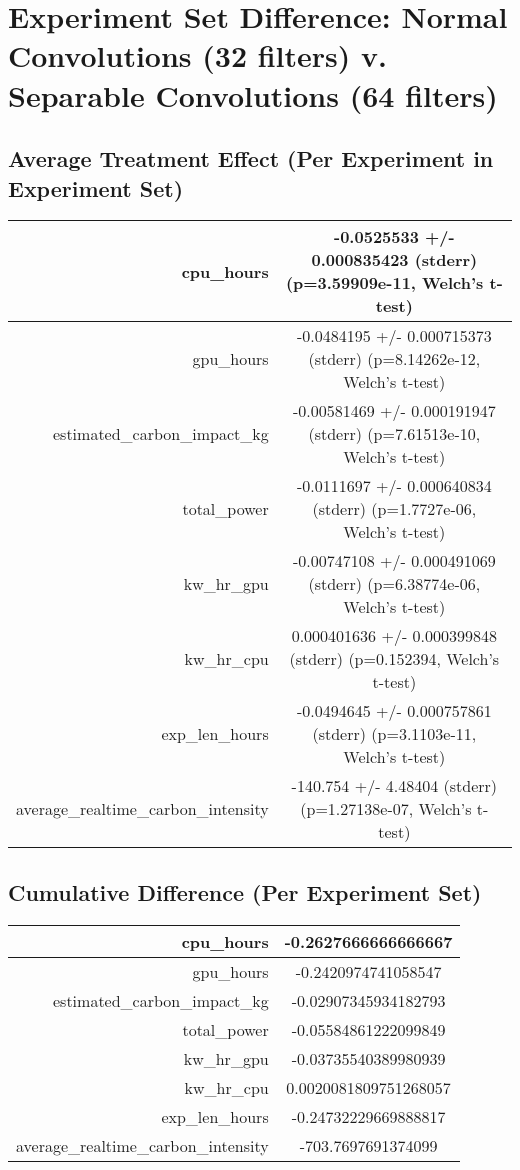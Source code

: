 \documentclass{article}%
\begin{document}
%
\normalsize%
\section{Experiment Set Difference: Normal Convolutions (32 filters) v. Separable Convolutions (64 filters)}%
\label{sec:Experiment Set Difference Normal Convolutions (32 filters) v. Separable Convolutions (64 filters)}%
\subsection{Average Treatment Effect (Per Experiment in Experiment Set)}%
\label{subsec:Average Treatment Effect (Per Experiment in Experiment Set)}%
\begin{tabular}{|r|c|}%
\hline%
cpu\_hours&{-}0.0525533 +/{-} 0.000835423 (stderr) (p=3.59909e{-}11, Welch's t{-}test)\\%
\hline%
gpu\_hours&{-}0.0484195 +/{-} 0.000715373 (stderr) (p=8.14262e{-}12, Welch's t{-}test)\\%
\hline%
estimated\_carbon\_impact\_kg&{-}0.00581469 +/{-} 0.000191947 (stderr) (p=7.61513e{-}10, Welch's t{-}test)\\%
\hline%
total\_power&{-}0.0111697 +/{-} 0.000640834 (stderr) (p=1.7727e{-}06, Welch's t{-}test)\\%
\hline%
kw\_hr\_gpu&{-}0.00747108 +/{-} 0.000491069 (stderr) (p=6.38774e{-}06, Welch's t{-}test)\\%
\hline%
kw\_hr\_cpu&0.000401636 +/{-} 0.000399848 (stderr) (p=0.152394, Welch's t{-}test)\\%
\hline%
exp\_len\_hours&{-}0.0494645 +/{-} 0.000757861 (stderr) (p=3.1103e{-}11, Welch's t{-}test)\\%
\hline%
average\_realtime\_carbon\_intensity&{-}140.754 +/{-} 4.48404 (stderr) (p=1.27138e{-}07, Welch's t{-}test)\\%
\hline%
\end{tabular}

%
\subsection{Cumulative Difference (Per Experiment Set)}%
\label{subsec:Cumulative Difference (Per Experiment Set)}%
\begin{tabular}{|r|c|}%
\hline%
cpu\_hours&{-}0.2627666666666667\\%
\hline%
gpu\_hours&{-}0.2420974741058547\\%
\hline%
estimated\_carbon\_impact\_kg&{-}0.02907345934182793\\%
\hline%
total\_power&{-}0.05584861222099849\\%
\hline%
kw\_hr\_gpu&{-}0.03735540389980939\\%
\hline%
kw\_hr\_cpu&0.0020081809751268057\\%
\hline%
exp\_len\_hours&{-}0.24732229669888817\\%
\hline%
average\_realtime\_carbon\_intensity&{-}703.7697691374099\\%
\hline%
\end{tabular}

%
\end{document}
